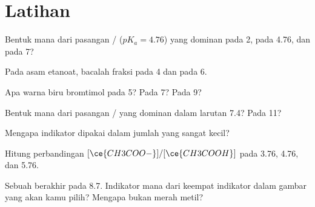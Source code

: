 \section{Latihan}


\begin{exercise}[$\star$]\label{exo:g12:buffers-predominance:1}
Bentuk mana dari pasangan / ($pK_a = 4.76$)
yang dominan pada  2, pada  4.76, dan pada  7?
\end{exercise}

\begin{exercise}[$\star$]\label{exo:g12:buffers-predominance:2}
Pada  asam etanoat, bacalah fraksi  pada
 4 dan pada  6.
\end{exercise}

\begin{exercise}[$\star$]\label{exo:g12:buffers-predominance:3}
Apa warna biru bromtimol pada  5? Pada  7? Pada  9?
\end{exercise}

\begin{exercise}[$\star$]\label{exo:g12:buffers-predominance:4}
Bentuk mana dari pasangan / yang dominan dalam larutan
 7.4? Pada  11?
\end{exercise}

\begin{exercise}[$\star$]\label{exo:g12:buffers-predominance:5}
Mengapa indikator dipakai dalam jumlah yang sangat kecil?
\end{exercise}

\begin{exercise}[$\star\star$]\label{exo:g12:buffers-predominance:6}
Hitung perbandingan $[\ce{CH3COO-}]/[\ce{CH3COOH}]$ pada  3.76, 4.76,
dan 5.76.
\end{exercise}

\begin{exercise}[$\star\star$]\label{exo:g12:buffers-predominance:7}
Sebuah  berakhir pada  8.7. Indikator mana dari keempat
indikator dalam gambar yang akan kamu pilih? Mengapa bukan merah metil?
\end{exercise}


